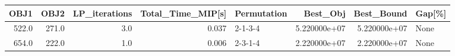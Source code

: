 \begin{tabular}{rrrrlrrl}
\toprule
  OBJ1 &   OBJ2 &  LP\_iterations &  Total\_Time\_MIP[s] & Permutation &      Best\_Obj &    Best\_Bound & Gap[\%] \\
\midrule
 522.0 &  271.0 &            3.0 &              0.037 &     2-1-3-4 &  5.220000e+07 &  5.220000e+07 &   None \\
 654.0 &  222.0 &            1.0 &              0.006 &     2-3-1-4 &  2.220000e+07 &  2.220000e+07 &   None \\
\bottomrule
\end{tabular}
